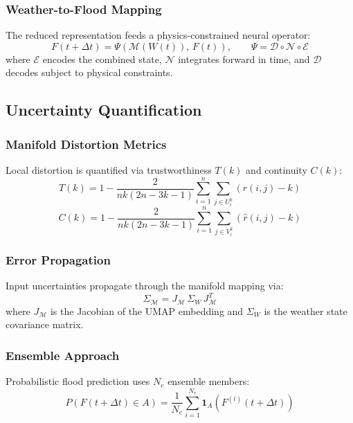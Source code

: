 \documentclass{article}
\begin{document}
\subsubsection{Weather-to-Flood Mapping}
The reduced representation feeds a physics-constrained neural operator:
\begin{equation}
    F(t + \Delta t) = \Psi(\mathcal{M}(W(t)),\, F(t)),
    \qquad \Psi = \mathcal{D} \circ \mathcal{N} \circ \mathcal{E}
\end{equation}
where $\mathcal{E}$ encodes the combined state, $\mathcal{N}$ integrates forward in time,
and $\mathcal{D}$ decodes subject to physical constraints.

\subsection{Uncertainty Quantification}

\subsubsection{Manifold Distortion Metrics}
Local distortion is quantified via trustworthiness $T(k)$ and continuity $C(k)$:
\begin{equation}
    T(k) = 1 - \frac{2}{nk(2n-3k-1)}\sum_{i=1}^{n}\sum_{j \in U_i^k}(r(i,j) - k)
\end{equation}
\begin{equation}
    C(k) = 1 - \frac{2}{nk(2n-3k-1)}\sum_{i=1}^{n}\sum_{j \in V_i^k}(\hat{r}(i,j) - k)
\end{equation}

\subsubsection{Error Propagation}
Input uncertainties propagate through the manifold mapping via:
\begin{equation}
    \Sigma_{\mathcal{M}} = J_{\mathcal{M}} \, \Sigma_W \, J_{\mathcal{M}}^T
\end{equation}
where $J_{\mathcal{M}}$ is the Jacobian of the UMAP embedding and $\Sigma_W$ is the
weather state covariance matrix.

\subsubsection{Ensemble Approach}
Probabilistic flood prediction uses $N_e$ ensemble members:
\begin{equation}
    P(F(t+\Delta t) \in A) = \frac{1}{N_e}\sum_{i=1}^{N_e}
    \mathbf{1}_{A}(F^{(i)}(t+\Delta t))
\end{equation}
\end{document}
